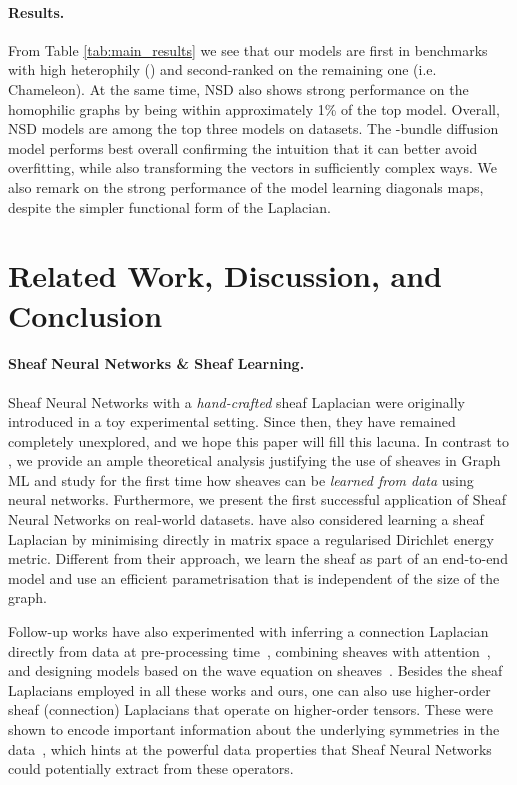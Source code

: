 \documentclass{article}
\begin{document}
\paragraph{Results.} From Table \ref{tab:main_results} we see that our models are first in  benchmarks with high heterophily () and second-ranked on the remaining one (i.e. Chameleon). At the same time, NSD also shows strong performance on the homophilic graphs by being within approximately 1\% of the top model. Overall, NSD models are among the top three models on  datasets. 
The -bundle diffusion model performs best overall confirming the intuition that it can better avoid overfitting, while also transforming the vectors in sufficiently complex ways. We also remark on the strong performance of the model learning diagonals maps, despite the simpler functional form of the Laplacian.

\section{Related Work, Discussion, and Conclusion}

\paragraph{Sheaf Neural Networks \& Sheaf Learning.} Sheaf Neural Networks \citep{hansen2020sheaf} with a \emph{hand-crafted} sheaf Laplacian were originally introduced in a toy experimental setting. Since then, they have remained completely unexplored, and we hope this paper will fill this lacuna. In contrast to \citep{hansen2020sheaf}, we provide an ample theoretical analysis justifying the use of sheaves in Graph ML and study for the first time how sheaves can be {\em learned from data} using neural networks. Furthermore, we present the first successful application of Sheaf Neural Networks on real-world datasets. \citet{hansen2019learning} have also considered learning a sheaf Laplacian by minimising directly in matrix space a regularised Dirichlet energy metric. Different from their approach, we learn the sheaf as part of an end-to-end model and use an efficient parametrisation that is independent of the size of the graph. 

Follow-up works have also experimented with inferring a connection Laplacian directly from data at pre-processing time~\citep{barbero2022sheaf}, combining sheaves with attention~\citep{barbero2022sheaf_att}, and designing models based on the wave equation on sheaves~\citep{suk2022surfing}. Besides the sheaf Laplacians employed in all these works and ours, one can also use higher-order sheaf (connection) Laplacians that operate on higher-order tensors. These were shown to encode important information about the underlying symmetries in the data~\citep{pfau2020disentangling}, which hints at the powerful data properties that Sheaf Neural Networks could potentially extract from these operators. 
\end{document}
